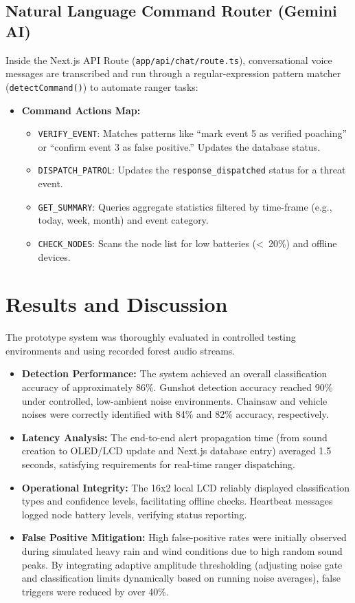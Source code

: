 \documentclass[11pt,a4paper]{article}
\begin{document}
\subsection{Natural Language Command Router (Gemini AI)}
Inside the Next.js API Route (\texttt{app/api/chat/route.ts}), conversational voice messages are transcribed and run through a regular-expression pattern matcher (\texttt{detectCommand()}) to automate ranger tasks:
\begin{itemize}
    \item \textbf{Command Actions Map:}
        \begin{itemize}
            \item \texttt{VERIFY\_EVENT}: Matches patterns like ``mark event 5 as verified poaching'' or ``confirm event 3 as false positive.'' Updates the database status.
            \item \texttt{DISPATCH\_PATROL}: Updates the \texttt{response\_dispatched} status for a threat event.
            \item \texttt{GET\_SUMMARY}: Queries aggregate statistics filtered by time-frame (e.g., today, week, month) and event category.
            \item \texttt{CHECK\_NODES}: Scans the node list for low batteries (\textless\ 20\%) and offline devices.
        \end{itemize}
\end{itemize}

\section{Results and Discussion}
The prototype system was thoroughly evaluated in controlled testing environments and using recorded forest audio streams.
\begin{itemize}
    \item \textbf{Detection Performance:} The system achieved an overall classification accuracy of approximately 86\%. Gunshot detection accuracy reached 90\% under controlled, low-ambient noise environments. Chainsaw and vehicle noises were correctly identified with 84\% and 82\% accuracy, respectively.
    \item \textbf{Latency Analysis:} The end-to-end alert propagation time (from sound creation to OLED/LCD update and Next.js database entry) averaged 1.5 seconds, satisfying requirements for real-time ranger dispatching.
    \item \textbf{Operational Integrity:} The 16x2 local LCD reliably displayed classification types and confidence levels, facilitating offline checks. Heartbeat messages logged node battery levels, verifying status reporting.
    \item \textbf{False Positive Mitigation:} High false-positive rates were initially observed during simulated heavy rain and wind conditions due to high random sound peaks. By integrating adaptive amplitude thresholding (adjusting noise gate and classification limits dynamically based on running noise averages), false triggers were reduced by over 40\%.
\end{itemize}
\end{document}
